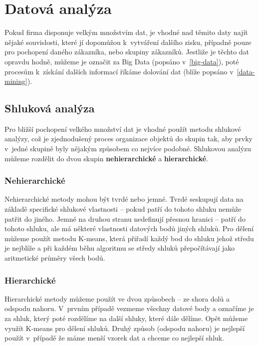 \section{Datová analýza}
\par Pokud firma disponuje velkým množstvím dat, je vhodné nad těmito daty najít nějaké souvislosti, které jí dopomůžou k~vytváření dalšího zisku, případně pouze pro pochopení daného zákazníka, nebo skupiny zákazníků. Jestliže je těchto dat opravdu hodně, můžeme je označit za Big Data (popsáno v~\ref{big-data}), poté procesům k~získání dalších informací říkáme dolování dat (blíže popsáno v~\ref{data-mining}).

\subsection{Shluková analýza}
\par Pro bližší pochopení velkého množství dat je vhodné použít metodu shlukové analýzy, což je zjednodušený proces organizace objektů do skupin tak, aby prvky v~jedné skupině byly nějakým způsobem co nejvíce podobné. Shlukovou analýzu můžeme rozdělit do dvou skupin \textbf{nehierarchické} a \textbf{hierarchické}.

\subsubsection{Nehierarchické}
\par Nehierarchické metody mohou být tvrdé nebo jemné. Tvrdé seskupují data na základě specifické shlukové vlastnosti -- pokud patří do tohoto shluku nemůže patřit do jiného. Jemné na druhou stranu nedefinují přesnou hranici -- patří do tohoto shluku, ale má některé vlastnosti datových bodů jiných shluků. Pro dělení můžeme použít metodu K-means, která přiřadí každý bod do shluku jehož středu je nejblíže a při každém běhu algoritmu se středy shluků přepočítávají jako aritmetické průměry všech bodů. \cite{big-data-anayitics}

\subsubsection{Hierarchické}
\par Hierarchické metody můžeme použít ve dvou způsobech -- ze shora dolů a odspodu nahoru. V~prvním případě vezmeme všechny datové body a označíme je za shluk, který poté rozdělíme na další shluky, které dále dělíme. Opět můžeme využít K-means pro dělení shluků. Druhý způsob (odspodu nahoru) je nejlepší použít v~případě že máme menší vzorek dat a chceme co nejlepší shluk. \cite{big-data-anayitics}

